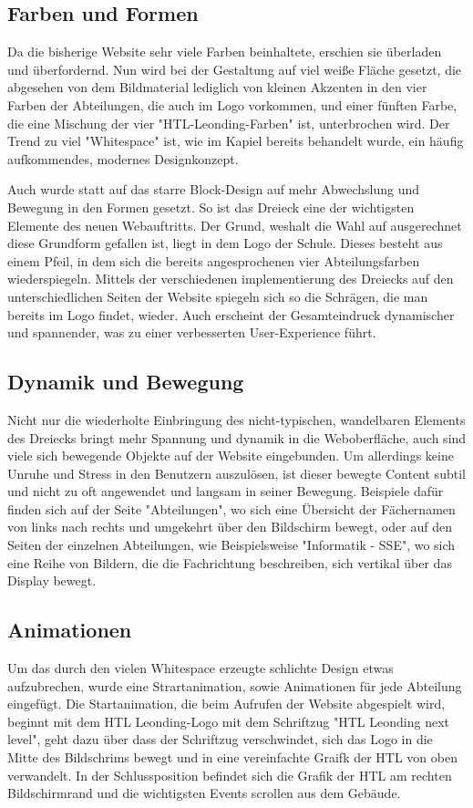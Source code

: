 \subsection{Farben und Formen}
Da die bisherige Website sehr viele Farben beinhaltete, erschien sie überladen und überfordernd.
Nun wird bei der Gestaltung auf viel weiße Fläche gesetzt, die abgesehen von dem Bildmaterial lediglich von kleinen Akzenten 
in den vier Farben der Abteilungen, die auch im Logo vorkommen, und einer fünften Farbe, die eine Mischung der vier 
"HTL-Leonding-Farben" ist, unterbrochen wird. Der Trend zu viel "Whitespace" ist, wie im Kapiel  bereits
behandelt wurde, ein häufig aufkommendes, modernes Designkonzept.

Auch wurde statt auf das starre Block-Design auf mehr Abwechslung und Bewegung in den Formen gesetzt.
So ist das Dreieck eine der wichtigsten Elemente des neuen Webauftritts. Der Grund, weshalt die Wahl 
auf ausgerechnet diese Grundform gefallen ist, liegt in dem Logo der Schule. Dieses besteht aus einem Pfeil,
in dem sich die bereits angesprochenen vier Abteilungsfarben wiederspiegeln. Mittels der verschiedenen
implementierung des Dreiecks auf den unterschiedlichen Seiten der Website spiegeln sich so die Schrägen,
die man bereits im Logo findet, wieder. Auch erscheint der Gesamteindruck
dynamischer und spannender, was zu einer verbesserten User-Experience führt.

\subsection{Dynamik und Bewegung}
Nicht nur die wiederholte Einbringung des nicht-typischen, wandelbaren Elements des Dreiecks
bringt mehr Spannung und dynamik in die Weboberfläche, auch sind viele sich bewegende Objekte auf 
der Website eingebunden. Um allerdings keine Unruhe und Stress in den Benutzern auszulösen, ist dieser
bewegte Content subtil und nicht zu oft angewendet und langsam in seiner Bewegung. Beispiele dafür finden sich 
auf der Seite "Abteilungen", wo sich eine Übersicht der Fächernamen von links nach rechts und umgekehrt
über den Bildschirm bewegt, oder auf den Seiten der einzelnen Abteilungen, wie Beispielsweise "Informatik - SSE", 
wo sich eine Reihe von Bildern, die die Fachrichtung beschreiben, sich vertikal über das Display bewegt.


\subsection{Animationen}
Um das durch den vielen Whitespace erzeugte schlichte Design etwas aufzubrechen, wurde eine Strartanimation,
sowie Animationen für jede Abteilung eingefügt. Die Startanimation, die beim Aufrufen der Website 
abgespielt wird, beginnt mit dem HTL Leonding-Logo mit dem Schriftzug "HTL Leonding next level", geht dazu über dass 
der Schriftzug verschwindet, sich das Logo in die Mitte des Bildschrims bewegt und  in eine vereinfachte Graifk der HTL von oben verwandelt.
In der Schlussposition befindet sich die Grafik der HTL am rechten Bildschirmrand und die 
wichtigsten Events scrollen aus dem Gebäude. 
